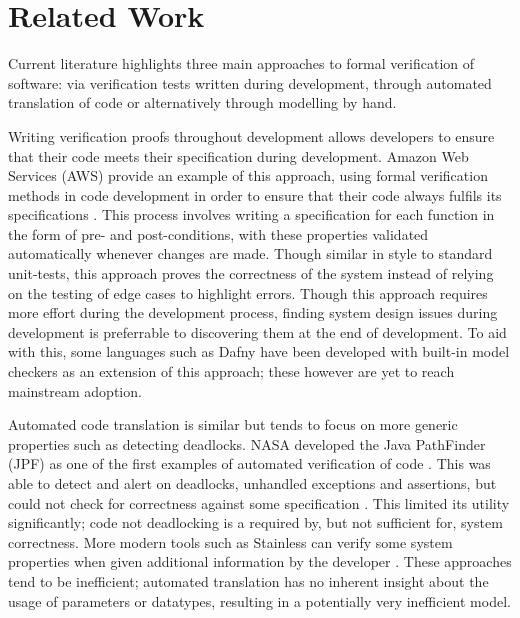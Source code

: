 \section{Related Work}


Current literature highlights three main approaches to formal verification of software: via verification tests written during development, through automated translation of code or alternatively through modelling by hand.

Writing verification proofs throughout development allows developers to ensure that their code meets their specification during development.
Amazon Web Services (AWS) provide an example of this approach, using formal verification methods in code development in order to ensure that their code always fulfils its specifications \cite{Amazon1, Amazon2}. This process involves writing a specification for each function in the form of pre- and post-conditions, with these properties validated automatically whenever changes are made. 
Though similar in style to standard unit-tests, this approach proves the correctness of the system instead of relying on the testing of edge cases to highlight errors. %
Though this approach requires more effort during the development process, finding system design issues during development is preferrable to discovering them at the end of development.
To aid with this, some languages such as Dafny \cite{Dafny} have been developed with built-in model checkers as an extension of this approach; these however are yet to reach mainstream adoption.

Automated code translation is similar but tends to focus on more generic properties such as detecting deadlocks. NASA developed the Java PathFinder (JPF) as one of the first examples of automated verification of code \cite{NASA1}. This was able to detect and alert on deadlocks, unhandled exceptions and assertions, but could not check for correctness against some specification \cite{NASA2}. This limited its utility significantly; code not deadlocking is a required by, but not sufficient for, system correctness. %
More modern tools such as Stainless can verify some system properties when given additional information by the developer \cite{C4DT}. These approaches tend to be inefficient; automated translation has no inherent insight about the usage of parameters or datatypes, resulting in a potentially very inefficient model.

